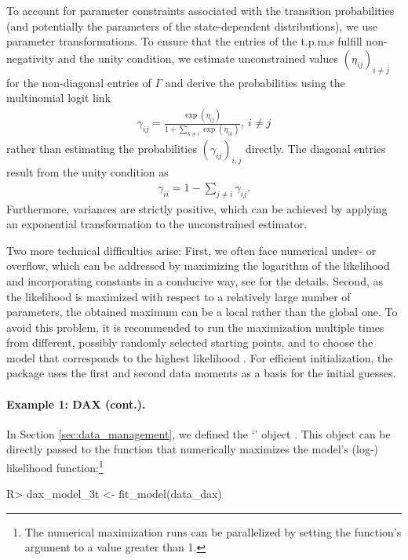 \documentclass[article]{jss}
\newcommand{\class}[1]{`\code{#1}'}
\newcommand{\fct}[1]{\code{#1()}}
\begin{document}
To account for parameter constraints associated with the transition probabilities (and potentially the parameters of the state-dependent distributions), we use parameter transformations. To ensure that the entries of the t.p.m.s fulfill non-negativity and the unity condition, we estimate unconstrained values $(\eta_{ij})_{i\neq j}$ for the non-diagonal entries of $\Gamma$ and derive the probabilities using the multinomial logit link
\begin{align*}
\gamma_{ij}=\frac{\exp(\eta_{ij})}{1+\sum_{k\neq i}\exp(\eta_{ik})},~i\neq j
\end{align*}
rather than estimating the probabilities $(\gamma_{ij})_{i,j}$ directly. The diagonal entries result from the unity condition as
\begin{align*}
\gamma_{ii}=1-\sum_{j\neq i}\gamma_{ij}.
\end{align*}
Furthermore, variances are strictly positive, which can be achieved by applying an exponential transformation to the unconstrained estimator.

Two more technical difficulties arise: First, we often face numerical under- or overflow, which can be addressed by maximizing the logarithm of the likelihood and incorporating constants in a conducive way, see \cite{oel21} for the details. Second, as the likelihood is maximized with respect to a relatively large number of parameters, the obtained maximum can be a local rather than the global one. To avoid this problem, it is recommended to run the maximization multiple times from different, possibly randomly selected starting points, and to choose the model that corresponds to the highest likelihood \citep{zuc16}. For efficient initialization, the  package uses the first and second data moments as a basis for the initial guesses.

\paragraph{Example 1: DAX (cont.).} In Section \ref{sec:data_management}, we defined the \class{fHMM\_data} object . This object can be directly passed to the \fct{fit\_model} function that numerically maximizes the model's (log-) likelihood function:\footnote{The numerical maximization runs can be parallelized by setting the function's  argument to a value greater than 1.}

%
\begin{Schunk}
\begin{Sinput}
R> dax_model_3t <- fit_model(data_dax)
\end{Sinput}
\end{Schunk}
%
\end{document}
